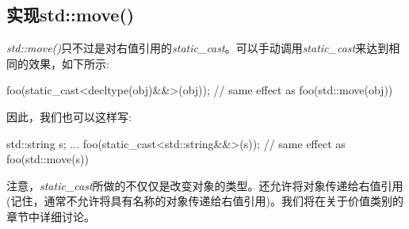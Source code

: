 \subsection{实现std::move()}

\textit{std::move()}只不过是对右值引用的\textit{static_cast}。可以手动调用\textit{static_cast}来达到相同的效果，如下所示:

\begin{cppcode}
foo(static_cast<decltype(obj)&&>(obj)); // same effect as foo(std::move(obj))
\end{cppcode}

因此，我们也可以这样写:

\begin{cppcode}
std::string s;
...
foo(static_cast<std::string&&>(s)); // same effect as foo(std::move(s))
\end{cppcode}

注意，\textit{static_cast}所做的不仅仅是改变对象的类型。还允许将对象传递给右值引用(记住，通常不允许将具有名称的对象传递给右值引用)。我们将在关于价值类别的章节中详细讨论。





























